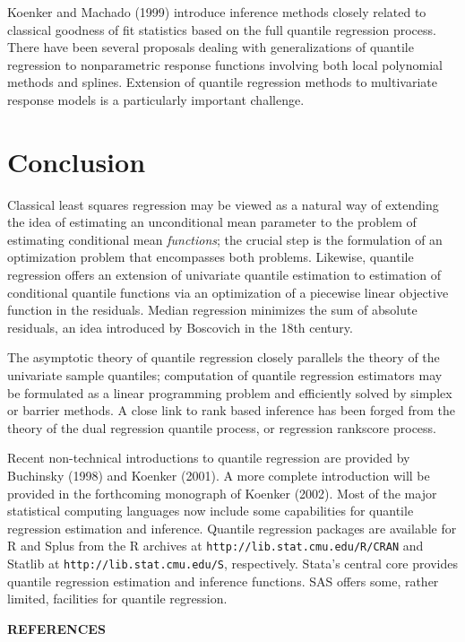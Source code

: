 \documentclass{amsart}
\newenvironment{apabib}{
  \noindent
\begin{center}
{\bf{ R}EFERENCES}
\end{center}
\vspace{-3mm}
\begin{list}{}{
  \topsep          0mm
  \leftmargin     10mm
  \parsep          0mm
  \listparindent -10mm}
  \item[]\strut\par}{
\end{list}}
\begin{document}
Koenker and Machado (1999) introduce inference methods 
closely related to classical goodness of fit statistics
based on the full quantile regression process.
There have been several proposals dealing with generalizations of quantile
regression to nonparametric response functions involving both local polynomial
methods and splines.
Extension of quantile regression methods to multivariate response models is a
particularly important challenge.

\section{Conclusion}

Classical least squares regression may be viewed as a
natural way of extending the idea of estimating an unconditional
mean parameter to the problem of estimating conditional mean {\it functions};
the crucial step is the formulation of an optimization problem
that encompasses both problems.  Likewise, quantile regression
offers an extension of univariate quantile estimation to estimation
of conditional quantile functions via an optimization of
a piecewise linear objective function in the residuals.  Median
regression minimizes the sum of absolute residuals, an idea introduced
by Boscovich in the 18th century.

The asymptotic theory of quantile regression closely parallels the
theory of the univariate sample quantiles; computation
of quantile regression estimators may be formulated as a linear
programming problem and efficiently solved by simplex or
barrier methods.  A close link to rank based inference has been
forged from the theory of the dual regression quantile process,
or regression rankscore process.

Recent non-technical introductions to quantile regression are provided
by Buchinsky (1998) and Koenker (2001).  A more complete introduction 
will be provided in the forthcoming monograph of Koenker (2002).
Most of the major statistical computing languages now include some
capabilities for quantile regression estimation and inference.
Quantile regression packages are available for R and Splus from  the R archives
at {\tt http://lib.stat.cmu.edu/R/CRAN} and 
Statlib at {\tt http://lib.stat.cmu.edu/S}, respectively.  Stata's 
central core provides quantile regression estimation and inference functions.
SAS offers some, rather limited, facilities for quantile regression. 

\vspace{15mm}
\begin{apabib}

\end{apabib}
\end{document}
